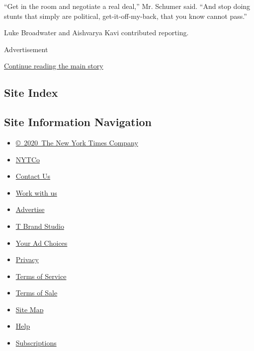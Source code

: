 ``Get in the room and negotiate a real deal,'' Mr. Schumer said. ``And
stop doing stunts that simply are political, get-it-off-my-back, that
you know cannot pass.''

Luke Broadwater and Aishvarya Kavi contributed reporting.

Advertisement

\protect\hyperlink{after-bottom}{Continue reading the main story}

\hypertarget{site-index}{%
\subsection{Site Index}\label{site-index}}

\hypertarget{site-information-navigation}{%
\subsection{Site Information
Navigation}\label{site-information-navigation}}

\begin{itemize}
\tightlist
\item
  \href{https://help.nytimes.com/hc/en-us/articles/115014792127-Copyright-notice}{©~2020~The
  New York Times Company}
\end{itemize}

\begin{itemize}
\tightlist
\item
  \href{https://www.nytco.com/}{NYTCo}
\item
  \href{https://help.nytimes.com/hc/en-us/articles/115015385887-Contact-Us}{Contact
  Us}
\item
  \href{https://www.nytco.com/careers/}{Work with us}
\item
  \href{https://nytmediakit.com/}{Advertise}
\item
  \href{http://www.tbrandstudio.com/}{T Brand Studio}
\item
  \href{https://www.nytimes.com/privacy/cookie-policy\#how-do-i-manage-trackers}{Your
  Ad Choices}
\item
  \href{https://www.nytimes.com/privacy}{Privacy}
\item
  \href{https://help.nytimes.com/hc/en-us/articles/115014893428-Terms-of-service}{Terms
  of Service}
\item
  \href{https://help.nytimes.com/hc/en-us/articles/115014893968-Terms-of-sale}{Terms
  of Sale}
\item
  \href{https://spiderbites.nytimes.com}{Site Map}
\item
  \href{https://help.nytimes.com/hc/en-us}{Help}
\item
  \href{https://www.nytimes.com/subscription?campaignId=37WXW}{Subscriptions}
\end{itemize}
